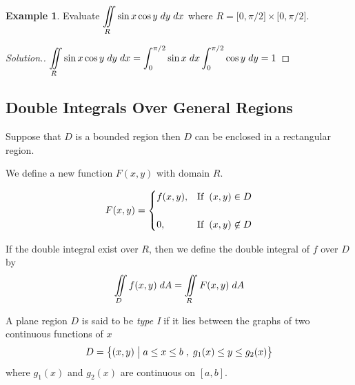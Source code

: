 \documentclass[11pt,a4paper]{article}
\theoremstyle{definition}
\newtheorem{exa}[thm]{Example}
\newenvironment{solution}
  {\renewcommand{\qedsymbol}{}\begin{proof}[\textit{Solution}.]}
  {\end{proof}}
\begin{document}
\begin{exa}


Evaluate $\displaystyle{\iint\limits_R \sin x \cos y \hspace{0.1cm} dy\hspace{0.1cm}dx}$ where $R = \big[ 0,\pi/2\big] \times \big[ 0,\pi/2\big]$.
\end{exa}


\begin{solution}


$\displaystyle{\iint\limits_R \sin x \cos y \hspace{0.1cm} dy\hspace{0.1cm}dx    = \int^{\pi/2}_0 \sin x \hspace{0.1cm} dx \int^{\pi/2}_0\cos y \hspace{0.1cm}dy\\
= 1}$
\end{solution}


{\color[wave]{485}\subsection{Double Integrals Over General Regions}}
Suppose that $D$ is a bounded region then $D$ can be enclosed in a rectangular region.


We define a new function $F(x,y)$ with domain $R$.

\[ F(x,y) = 
\begin{cases}
f(x,y) , & \text{If}\hspace{0.2cm} (x,y)\in D\\\\
0 , & \text{If} \hspace{0.2cm} (x,y)\not\in D\\
\end{cases}
\]

If the double integral exist over $R$, then we define the double integral of $f$ over $D$ by $$\iint\limits_D f(x,y)\hspace{0.1cm}dA = \iint\limits_R F(x,y)\hspace{0.1cm}dA$$

A plane region $D$ is said to be \textit{type I} if it lies between the graphs of two continuous functions of $x$ $$ D = \big\{ (x,y)\hspace{0.1cm} \big|\hspace{0.1cm} a \leq x \leq b \hspace{0.1cm} , \hspace{0.1cm} g_1(x) \leq y\leq g_2(x)\big\}$$ where $g_1(x)$ and $g_2(x)$ are continuous on $[a,b]$.
\end{document}
